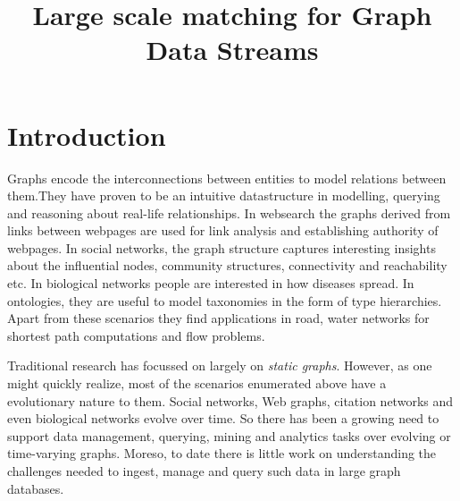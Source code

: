 \documentclass{scrartcl}
\begin{document}
  
 \title{Large scale matching for Graph Data Streams}
 \maketitle

\section{Introduction}

Graphs encode the interconnections between entities to model relations between them.They have proven to be an intuitive datastructure in modelling, querying and reasoning about real-life relationships. In websearch the graphs derived from links between webpages are used for link analysis and establishing authority of webpages. In social networks, the graph structure captures interesting insights about the influential nodes, community structures, connectivity and reachability etc. In biological networks people are interested in how diseases spread. In ontologies, they are useful to model taxonomies in the form of type hierarchies. Apart from these scenarios they find applications in road, water networks for shortest path computations and flow problems.

Traditional research has focussed on largely on \emph{static graphs}. However, as one might quickly realize, most of the scenarios enumerated above have a evolutionary nature to them. Social networks, Web graphs, citation networks and even biological networks evolve over time. So there has been a growing need to support data management, querying, mining and analytics tasks over evolving or time-varying graphs.  Moreso, to date there is little work on understanding the challenges needed to ingest, manage and query such data in large graph databases. 
\end{document}
